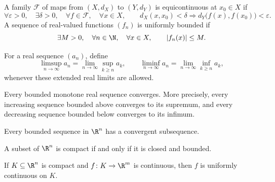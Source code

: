     \begin{definition}
        A family $\mathcal{F}$ of maps from $(X,d_X)$ to $(Y,d_Y)$ is
        equicontinuous at $x_0\in X$ if
        \[
            \forall\varepsilon>0,
            \quad
            \exists\delta>0,
            \quad
            \forall f\in\mathcal{F},
            \quad
            \forall x\in X,
            \qquad
            d_X(x,x_0)<\delta
            \Rightarrow
            d_Y\bigl(f(x),f(x_0)\bigr)<\varepsilon.
        \]
        A sequence of real-valued functions $(f_n)$ is uniformly bounded if
        \[
            \exists M>0,
            \quad
            \forall n\in\N,
            \quad
            \forall x\in X,
            \qquad
            |f_n(x)|\leq M.
        \]
    \end{definition}

    \begin{definition}
        For a real sequence $(a_n)$, define
        \[
            \limsup_{n\to\infty} a_n
            =
            \lim\limits_{n\to\infty}\sup_{k\geq n} a_k,
            \qquad
            \liminf_{n\to\infty} a_n
            =
            \lim\limits_{n\to\infty}\inf_{k\geq n} a_k,
        \]
        whenever these extended real limits are allowed.
    \end{definition}

    \begin{theorem}
        Every bounded monotone real sequence converges. More precisely, every
        increasing sequence bounded above converges to its supremum, and every
        decreasing sequence bounded below converges to its infimum.
    \end{theorem}

    \begin{theorem}
        Every bounded sequence in $\R^n$ has a convergent subsequence.
    \end{theorem}

    \begin{theorem}
        A subset of $\R^n$ is compact if and only if it is closed and bounded.
    \end{theorem}

    \begin{theorem}
        If $K\subseteq\R^n$ is compact and $f\colon K\to\R^m$ is continuous, then $f$
        is uniformly continuous on $K$.
    \end{theorem}

